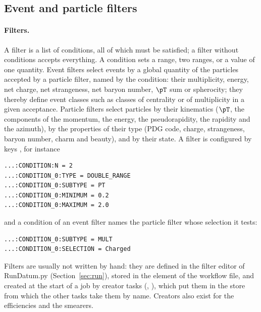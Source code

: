 \subsection{Event and particle filters}
\label{sec:filters}

\paragraph{Filters.}
A filter is a list of conditions, all of which must be satisfied; a filter without conditions accepts everything. A
condition sets a range, two ranges, or a value of one quantity. Event filters select events by a global quantity of the particles accepted by a particle filter, named by the condition: their multiplicity, energy, net charge, net strangeness, net baryon number, $\pT$ sum or spherocity; they thereby define event classes such as classes of centrality or of multiplicity in a given acceptance. Particle filters select particles by their kinematics ($\pT$, the components of the momentum, the energy, the pseudorapidity, the rapidity and the azimuth), by the properties of their type (PDG code, charge, strangeness, baryon number, charm and beauty), and by their state. A filter is configured by keys , for instance
{\footnotesize
\begin{verbatim}
...:CONDITION:N = 2
...:CONDITION_0:TYPE = DOUBLE_RANGE
...:CONDITION_0:SUBTYPE = PT
...:CONDITION_0:MINIMUM = 0.2
...:CONDITION_0:MAXIMUM = 2.0
\end{verbatim}}
\noindent and a condition of an event filter names the particle filter whose selection it tests:
{\footnotesize
\begin{verbatim}
...:CONDITION_0:SUBTYPE = MULT
...:CONDITION_0:SELECTION = Charged
\end{verbatim}}
\noindent Filters are usually not written by hand: they are defined in the filter editor of RunDatum.py (Section~\ref{sec:run}),
stored in the  element of the workflow file, and created at the start of a job by creator tasks
(, ), which put them in the store from which the other tasks take
them by name. Creators also exist for the efficiencies and the smearers.

